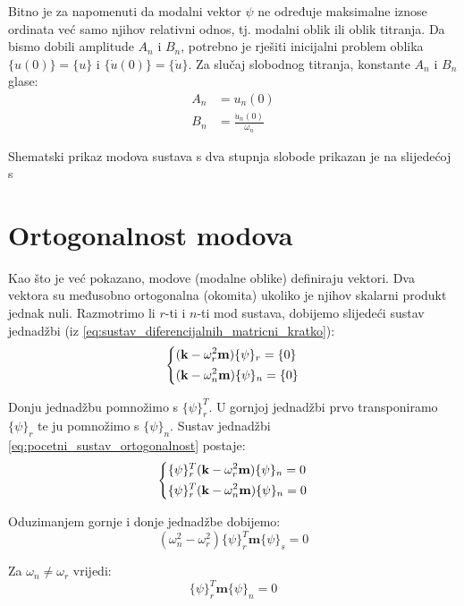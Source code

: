 \documentclass{rgn}
\newcommand\mm{\mathbf{m}}
\newcommand\kk{\mathbf{k}}
\begin{document}
Bitno je za napomenuti da modalni vektor $\psi$ ne određuje maksimalne iznose
ordinata već samo njihov relativni odnos, tj. modalni oblik ili oblik titranja. Da
bismo dobili amplitude $A_n$ i $B_n$, potrebno je rješiti inicijalni problem oblika 
$\{u(0)\} = \{u\}$ i $\{\dot{u}(0)\}=\{\dot{u}\}$. Za slučaj slobodnog titranja,
konstante $A_n$ i $B_n$ glase:
\begin{align}
    A_n&=u_n(0)\\
    B_n&=\frac{\dot{u}_n(0)}{\omega_n}
\end{align}

Shematski prikaz modova sustava s dva stupnja slobode prikazan je na slijedećoj
s

\section{Ortogonalnost modova}
Kao što je već pokazano, modove (modalne oblike) definiraju vektori. Dva vektora su
međusobno ortogonalna (okomita) ukoliko je njihov skalarni produkt jednak nuli.
Razmotrimo li $r$-ti i $n$-ti mod sustava, dobijemo slijedeći sustav jednadžbi 
(iz \eqref{eq:sustav_diferencijalnih_matricni_kratko}):
\begin{equation}\label{eq:pocetni_sustav_ortogonalnost}
    \begin{dcases}
        (\kk-\omega_r^2\mm)\{\psi\}_r=\{0\}\\
        (\kk-\omega_n^2\mm)\{\psi\}_n=\{0\}
    \end{dcases}
\end{equation}

Donju jednadžbu pomnožimo s $\{\psi\}_r^T$. U gornjoj jednadžbi prvo
transponiramo $\{\psi\}_r$ te ju pomnožimo s $\{\psi\}_n$. Sustav jednadžbi
\eqref{eq:pocetni_sustav_ortogonalnost} postaje:
\begin{equation}\label{eq:konacni_sustav_ortogonalnost}
    \begin{dcases}
        \{\psi\}_r^T(\kk-\omega_r^2\mm)\{\psi\}_n=0\\
        \{\psi\}_r^T(\kk-\omega_n^2\mm)\{\psi\}_n=0
    \end{dcases}
\end{equation}

Oduzimanjem gornje i donje jednadžbe dobijemo:
\begin{equation}
    (\omega_n^2-\omega_r^2)\{\psi\}_r^T\mm\{\psi\}_s=0
\end{equation}

Za $\omega_n\neq\omega_r$ vrijedi:
\begin{equation}\label{eq:ortogonalnost_masa}
    \{\psi\}_r^T\mm\{\psi\}_n=0
\end{equation}
\end{document}
